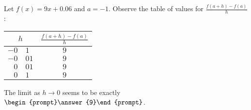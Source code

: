\documentclass{ximera}
\author{Gregory Hartman \and Matthew Carr}
\begin{document}
\begin{exercise}







Let $f(x) = 9x+0.06$ and $a=-1$. Observe the table of values for $\frac{f(a+h)-f({a})}{h}$:
\begin{center}
 \begin{tabular}{r@{.}lc}
  \multicolumn{2}{c}{$h$} & $\frac{f(a+h)-f({a})}{h}$\\ \hline 
  $-0$ & $1$ & $9$ \\
  $-0$ & $01$ & $9$ \\
  $0$ & $01$ & $9$ \\
  $0$ & $1$ & $9$
 \end{tabular}
\end{center}
The limit as $h\to 0$ seems to be exactly $\begin{prompt}\answer{9}\end{prompt}$.

\end{exercise}
\end{document}
